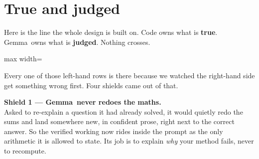 \documentclass[11pt]{article}
\newcommand{\themodel}{Gemma}
\begin{document}
\section{True and judged}

Here is the line the whole design is built on. Code owns what is \textbf{true}.
\themodel\ owns what is \textbf{judged}. Nothing crosses.

\vspace{0.5em}
\begin{center}
\begin{adjustbox}{max width=\textwidth}
\end{adjustbox}
\end{center}

\vspace{0.2em}
Every one of those left-hand rows is there because we watched the right-hand
side get something wrong first. Four shields came out of that.

\begin{shieldbox}
\textbf{Shield 1 --- \themodel\ never redoes the maths.}\\
Asked to re-explain a question it had already solved, it would quietly redo the
sums and land somewhere new, in confident prose, right next to the correct
answer. So the verified working now rides inside the prompt as the only
arithmetic it is allowed to state. Its job is to explain \emph{why} your method
fails, never to recompute.
\end{shieldbox}
\end{document}
